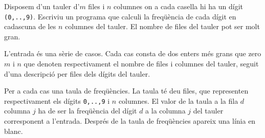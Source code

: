 

\Statement

Disposem d'un tauler d'$m$ files i $n$ columnes on a cada casella hi ha un dígit {\tt (0,..,9)}. Escriviu un programa que calculi la freqüència de cada dígit en cadascuna de les $n$ columnes del tauler.  El nombre de files del tauler pot ser molt gran.

\Input

L'entrada és una sèrie de casos. Cada cas consta de dos enters més grans que zero $m$ i $n$ que denoten respectivament el nombre de files i columnes del tauler, seguit d'una descripció per files dels dígits del tauler.


\Output

Per a cada cas  una taula de freqüències. La taula té deu files, que representen respectivament els dígits {\tt 0,..,9} i $n$ columnes. El valor de la taula a la fila $d$ columna $j$ ha de ser la freqüència del dígit $d$ a la columna $j$ del tauler corresponent a l'entrada. Després de la taula de freqüències apareix una línia en blanc.


\Sample
